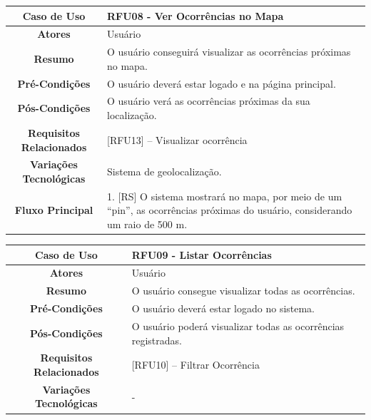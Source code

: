 \begin{apendicesenv}
\begin{quadro}[htb]
	\begin{tabular}{|c|p{11cm}|}
		\hline
		\textbf{Caso de Uso} & RFU08 - Ver Ocorrências no Mapa \\ \hline
		\textbf{Atores} & Usuário \\ \hline
		\textbf{Resumo} & O usuário conseguirá visualizar as ocorrências próximas no mapa. \\ \hline
		\textbf{Pré-Condições} & O usuário deverá estar logado e na página principal. \\ \hline
		\textbf{Pós-Condições} & O usuário verá as ocorrências próximas da sua localização. \\ \hline
		\textbf{Requisitos Relacionados} & [RFU13] -- Visualizar ocorrência \\ \hline
		\textbf{Variações Tecnológicas} & Sistema de geolocalização. \\ \hline
		
		\textbf{Fluxo Principal} &
		\parbox[t]{11cm}{
			\raggedright
			1. [RS] O sistema mostrará no mapa, por meio de um ``pin'', as ocorrências próximas do usuário, considerando um raio de 500 m.
		}
		\\ \hline
		
		\textbf{Tratamento de Exceções} &
		\parbox[t]{11cm}{
			\raggedright
			-- 
		}
		\\ \hline
	\end{tabular}
	
\end{quadro}

\begin{quadro}[htb]
	\centering
	\caption{\label{quadro_rfu09}Caso de Uso Listar Ocorrências (Baixo Nível)}
	\small
	\renewcommand{\arraystretch}{1.1}
	
	\begin{tabular}{|c|p{11cm}|}
		\hline
		\textbf{Caso de Uso} & RFU09 - Listar Ocorrências \\ \hline
		\textbf{Atores} & Usuário \\ \hline
		\textbf{Resumo} & O usuário consegue visualizar todas as ocorrências. \\ \hline
		\textbf{Pré-Condições} & O usuário deverá estar logado no sistema. \\ \hline
		\textbf{Pós-Condições} & O usuário poderá visualizar todas as ocorrências registradas. \\ \hline
		\textbf{Requisitos Relacionados} & [RFU10] -- Filtrar Ocorrência \\ \hline
		\textbf{Variações Tecnológicas} & - \\ \hline
		

\end{tabular}
\end{quadro}
\end{apendicesenv}
